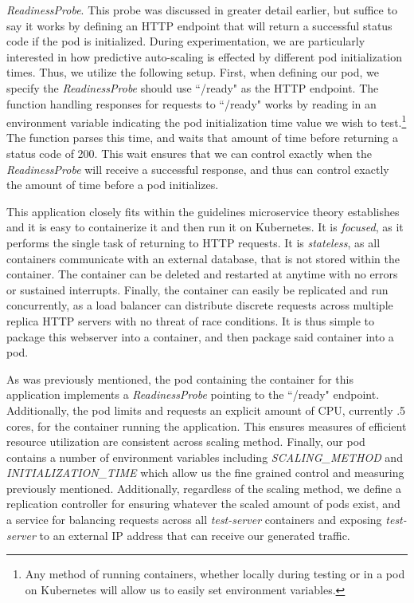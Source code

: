 \begin{itemize}
    \textit{ReadinessProbe}. This probe was discussed in greater detail earlier,
    but suffice to say it works by defining an HTTP endpoint that will return a
    successful status code if the pod is initialized. During experimentation, we
    are particularly interested in how predictive auto-scaling is effected by
    different pod initialization times. Thus, we utilize the following setup.
    First, when defining our pod, we specify the \textit{ReadinessProbe} should
    use ``/ready" as the HTTP endpoint. The function handling responses for
    requests to ``/ready" works by reading in an environment variable indicating
    the pod initialization time value we wish to test.\footnote{Any method of
    running containers, whether locally during testing or in a pod on Kubernetes
    will allow us to easily set environment variables.} The function parses this
    time, and waits that amount of time before returning a status code of 200.
    This wait ensures that we can control exactly when the
    \textit{ReadinessProbe} will receive a successful response, and thus can
    control exactly the amount of time before a pod initializes.
\end{itemize}

This application closely fits within the guidelines microservice theory
establishes and it is easy to containerize it and then run it on Kubernetes. It
is \textit{focused}, as it performs the single task of returning to HTTP
requests. It is \textit{stateless}, as all containers communicate with an
external database, that is not stored within the container. The container can be
deleted and restarted at anytime with no errors or sustained interrupts.
Finally, the container can easily be replicated and run concurrently, as
a load balancer can distribute discrete requests across multiple replica HTTP
servers with no threat of race conditions. It is thus simple to package this
webserver into a container, and then package said container into a pod.

As was previously mentioned, the pod containing the container for this
application implements a \textit{ReadinessProbe} pointing to the ``/ready"
endpoint. Additionally, the pod limits and requests an explicit amount of CPU,
currently .5 cores, for the container running the application. This ensures
measures of efficient resource utilization are consistent across scaling method.
Finally, our pod contains a number of environment variables including
\textit{SCALING\_METHOD} and \textit{INITIALIZATION\_TIME} which allow us the
fine grained control and measuring previously mentioned. Additionally,
regardless of the scaling method, we define a replication controller for
ensuring whatever the scaled amount of pods exist, and a service for balancing
requests across all \textit{test-server} containers and exposing
\textit{test-server} to an external IP address that can receive our generated
traffic.
